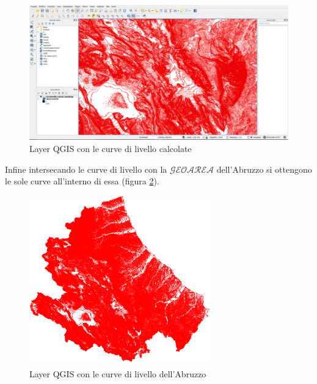 \begin{figure}[H]
	\centering
	\includegraphics[width=1\textwidth]{images/IsoipseGenerate}
	\caption{Layer QGIS con le curve di livello calcolate}
	\label{fig:QGis_Isoipse}
\end{figure}
Infine intersecando le curve di livello con la $\mathcal{GEOAREA}$ dell'Abruzzo si ottengono le sole curve all'interno di essa (figura \ref{fig:QGis_Isoipse_aBruzzo}).
\begin{figure}[H]
	\centering
	\includegraphics[width=0.7\textwidth]{images/AbruzzoIsoipse}
	\caption{Layer QGIS con le curve di livello dell'Abruzzo}
	\label{fig:QGis_Isoipse_aBruzzo}
\end{figure}